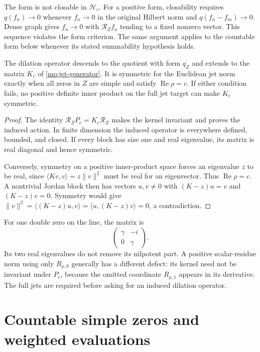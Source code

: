 The form is not closable in $\mathscr H_c$. For a positive form,
closability requires $q(f_n)\to0$ whenever $f_n\to0$ in the
original Hilbert norm and $q(f_n-f_m)\to0$. Dense graph gives
$f_n\to0$ with $\mathcal R_Zf_n$ tending to a fixed nonzero
vector. This sequence violates the form criterion. The same
argument applies to the countable form below whenever its stated
summability hypothesis holds.

\begin{theorem}
\label{mo:finite-symmetry}
The dilation operator descends to the quotient with form $q_Z$ and
extends to the matrix $K_c$ of \eqref{mo:jet-generator}.
It is symmetric for the Euclidean jet norm exactly when all zeros
in $Z$ are simple and satisfy $\operatorname{Re}\rho=c$.
If either condition fails, no positive definite inner product on
the full jet target can make $K_c$ symmetric.
\end{theorem}
\begin{proof}
The identity $\mathcal R_ZP_c=K_c\mathcal R_Z$ makes the kernel
invariant and proves the induced action. In finite dimension the
induced operator is everywhere defined, bounded, and closed.
If every block has size one and real eigenvalue, its matrix is
real diagonal and hence symmetric.

Conversely, symmetry on a positive inner-product space forces
an eigenvalue $z$ to be real, since
$\langle Kv,v\rangle=z\|v\|^2$ must be real for an eigenvector.
Thus $\operatorname{Re}\rho=c$. A nontrivial Jordan block then
has vectors $u,v\ne0$ with $(K-z)u=v$ and $(K-z)v=0$.
Symmetry would give
$\|v\|^2=\langle(K-z)u,v\rangle=
\langle u,(K-z)v\rangle=0$, a contradiction.
\end{proof}

For one double zero on the line, the matrix is
\[
 \begin{pmatrix}\gamma&-i\\0&\gamma\end{pmatrix}.
\]
Its two real eigenvalues do not remove its nilpotent part. A
positive scalar-residue norm using only $R_{\rho,0}$ generally
has a different defect: its kernel need not be invariant under
$P_c$, because the omitted coordinate $R_{\rho,1}$ appears in
its derivative. The full jets are required before asking for
an induced dilation operator.

\section{Countable simple zeros and weighted evaluations}

